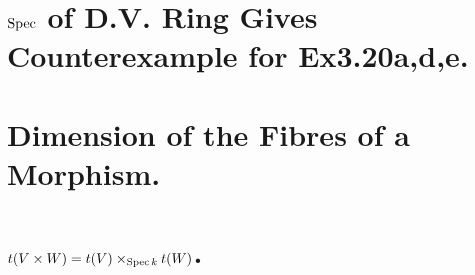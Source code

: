 \documentclass[a4paper]{jsarticle}
\begin{document}
\section{$\operatorname{Spec}$ of D.V. Ring Gives Counterexample for Ex3.20a,d,e.} %

\section{Dimension of the Fibres of a Morphism.} %

\section{$t(V \times W)=t(V) \times_{\operatorname{Spec} k} t(W)$.} %
\end{document}
